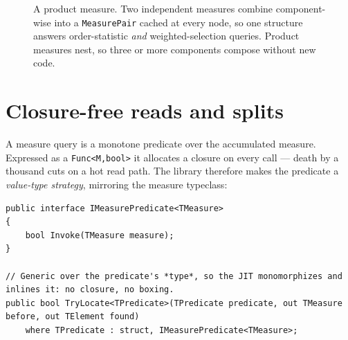 \documentclass[11pt]{article}
\newcommand{\cs}[1]{\lstinline|#1|}
\newcommand{\bigO}{\ensuremath{\mathcal{O}}}
\begin{document}
\begin{figure}[ht]
\centering
{}
\caption{A product measure. Two independent measures combine component-wise into a \texttt{MeasurePair}
cached at every node, so one structure answers order-statistic \emph{and} weighted-selection queries.
Product measures nest, so three or more components compose without new code.}
\label{fig:product}
\end{figure}

\section{Closure-free reads and splits}
\label{sec:predicates}

A measure query is a monotone predicate over the accumulated measure. Expressed as a \cs{Func<M,bool>}
it allocates a closure on every call --- death by a thousand cuts on a hot read path. The library
therefore makes the predicate a \emph{value-type strategy}, mirroring the measure typeclass:

\begin{lstlisting}
public interface IMeasurePredicate<TMeasure>
{
    bool Invoke(TMeasure measure);
}

// Generic over the predicate's *type*, so the JIT monomorphizes and inlines it: no closure, no boxing.
public bool TryLocate<TPredicate>(TPredicate predicate, out TMeasure before, out TElement found)
    where TPredicate : struct, IMeasurePredicate<TMeasure>;
\end{lstlisting}
\end{document}
